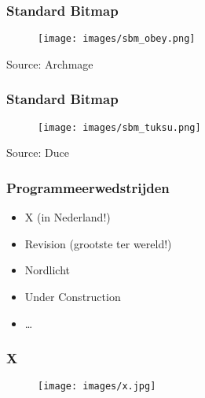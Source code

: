 \documentclass[aspectratio=43]{uva-inf-presentation}
\begin{document}

\begin{frame}
\frametitle{Standard Bitmap}

\begin{figure}
\texttt{[image: images/sbm\_obey.png]}
\end{figure}

\begin{center}
Source: Archmage
\end{center}

\end{frame}


\begin{frame}
\frametitle{Standard Bitmap}

\begin{figure}
\texttt{[image: images/sbm\_tuksu.png]}
\end{figure}

\begin{center}
Source: Duce
\end{center}

\end{frame}


\begin{frame}
\frametitle{Programmeerwedstrijden}

\begin{itemize}
\item X (in Nederland!)
\item Revision (grootste ter wereld!)
\item Nordlicht
\item Under Construction
\item \dots
\end{itemize}

\end{frame}


\begin{frame}
\frametitle{X}

\begin{figure}
\texttt{[image: images/x.jpg]}
\end{figure}

\end{frame}
\end{document}
